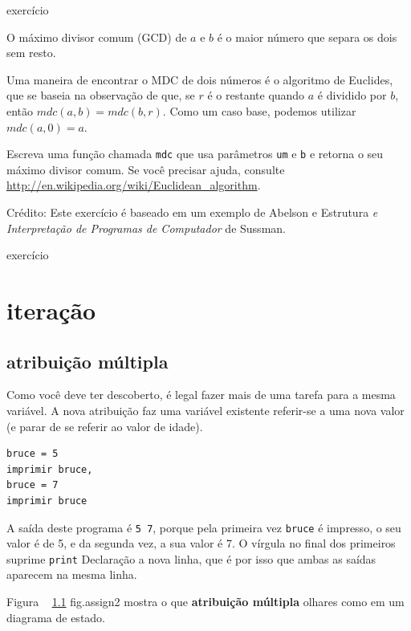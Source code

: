 \documentclass[10pt]{book}
\begin{document}
{{\begin{} exercício

O máximo divisor comum (GCD) de $ a $ e $ b $ é o maior número
que separa os dois sem resto.  

Uma maneira de encontrar o MDC de dois números é o algoritmo de Euclides,
que se baseia na observação de que, se $ r $ é o restante
quando $ a $ é dividido por $ b $, então $ mdc (a, b) = mdc (b, r) $.
Como um caso base, podemos utilizar $ mdc (a, 0) = a $.

Escreva uma função chamada
\Verb "mdc" que usa parâmetros {\tt um} e {\tt b}
e retorna o seu máximo divisor comum. Se você precisar
ajuda, consulte \url{http://en.wikipedia.org/wiki/Euclidean_algorithm}.

Crédito: Este exercício é baseado em um exemplo de Abelson e
{Estrutura \em e Interpretação de Programas de Computador} de Sussman.

\end{} exercício


\chapter{iteração}

\section{atribuição múltipla}

Como você deve ter descoberto, é legal
fazer mais de uma tarefa para a mesma variável. A
nova atribuição faz uma variável existente referir-se a uma nova
valor (e parar de se referir ao valor de idade).

\begin{verbatim}
bruce = 5
imprimir bruce,
bruce = 7
imprimir bruce
\end{verbatim}
%
A saída deste programa é {\tt 5 7}, porque pela primeira vez
{\tt bruce} é impresso, o seu valor é de 5, e da segunda vez, a sua
valor é 7. O
vírgula no final dos primeiros suprime {\tt print} Declaração
a nova linha, que é por isso que ambas as saídas
aparecem na mesma linha.

Figura ~ \ref {} fig.assign2 mostra o que {\bf atribuição múltipla} olhares
como em um diagrama de estado.  

}}
\end{document}
